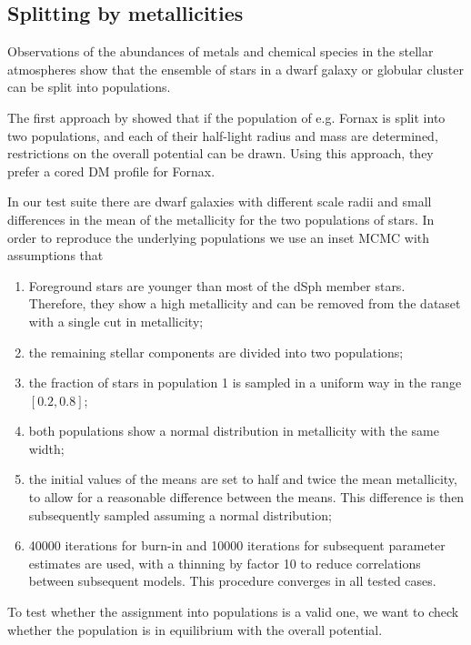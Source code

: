 \subsection{Splitting by metallicities}\label{sec:metals}

Observations of the abundances of metals and chemical species in the
stellar atmospheres show that the ensemble of stars in a dwarf galaxy
or globular cluster can be split into populations.

The first approach by \cite{WalkerPenarrubia2012} showed that if the
population of e.g. Fornax is split into two populations, and each of
their half-light radius and mass are determined, restrictions on the
overall potential can be drawn. Using this approach, they prefer a
cored DM profile for Fornax.

In our test suite there are dwarf galaxies with different scale radii
and small differences in the mean of the metallicity for the two
populations of stars. In order to reproduce the underlying populations
we use an inset MCMC with assumptions that

\begin{enumerate}
\item Foreground stars are younger than most of the dSph member
  stars. Therefore, they show a high metallicity and can be removed
  from the dataset with a single cut in metallicity;
\item the remaining stellar components are divided into two
  populations;
\item the fraction of stars in population 1 is sampled in a uniform
  way in the range $[0.2,0.8]$;
\item both populations show a normal distribution in metallicity with
  the same width;
\item the initial values of the means are set to half and twice the
  mean metallicity, to allow for a reasonable difference between the
  means. This difference is then subsequently sampled assuming a
  normal distribution;
\item 40000 iterations for burn-in and 10000 iterations for subsequent
  parameter estimates are used, with a thinning by factor 10 to reduce
  correlations between subsequent models. This procedure converges in
  all tested cases.
\end{enumerate}

To test whether the assignment into populations is a valid one, we
want to check whether the population is in equilibrium with the
overall potential.

